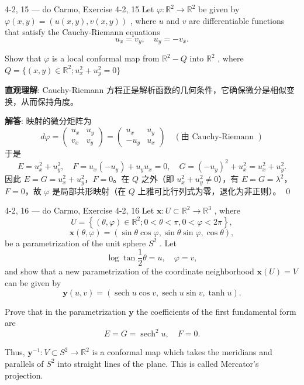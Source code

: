 \begin{exercise}{4-2, 15 — do Carmo, Exercise 4-2, 15}
Let $\varphi \colon \mathbb{R}^2 \to \mathbb{R}^2$ be given by $\varphi(x, y) = (u(x, y), v(x, y))$ , where $u$ and $v$ are differentiable functions that satisfy the Cauchy-Riemann equations
\[
u _ {x} = v _ {y}, \quad u _ {y} = - v _ {x}.
\]

Show that $\varphi$ is a local conformal map from $\mathbb{R}^2 -Q$ into $\mathbb{R}^2$ , where $Q = \{(x,y)\in \mathbb{R}^2;u_x^2 +u_y^2 = 0\}$
\end{exercise}

\begin{solution}
\textbf{直观理解}: Cauchy-Riemann 方程正是解析函数的几何条件，它确保微分是相似变换，从而保持角度。

\textbf{解答}: 映射的微分矩阵为
\[
d\varphi = \begin{pmatrix}u_x & u_y\\ v_x & v_y\end{pmatrix} = \begin{pmatrix}u_x & u_y\\ -u_y & u_x\end{pmatrix}\quad(\text{由 Cauchy-Riemann })
\]
于是
\[
E = u_x^2+u_y^2,\quad F = u_x(-u_y)+u_y u_x = 0,\quad G = (-u_y)^2+u_x^2 = u_x^2+u_y^2.
\]
因此 $E=G = u_x^2+u_y^2$，$F=0$。在 $Q$ 之外（即 $u_x^2+u_y^2\neq 0$），有 $E=G=\lambda^2$，$F=0$，故 $\varphi$ 是局部共形映射（在 $Q$ 上雅可比行列式为零，退化为非正则）。
\qed
\end{solution}

\begin{exercise}{4-2, 16 — do Carmo, Exercise 4-2, 16}
Let $\mathbf{x}\colon U\subset \mathbb{R}^2\to \mathbb{R}^3$ , where
\[
U = \left\{\left(\theta , \varphi\right) \in \mathbb{R} ^ {2}; 0 < \theta < \pi , 0 < \varphi < 2 \pi \right\},
\]
\[
\mathbf {x} (\theta , \varphi) = (\sin \theta \cos \varphi , \sin \theta \sin \varphi , \cos \theta),
\]
be a parametrization of the unit sphere $S^2$ . Let
\[
\log \tan \frac {1}{2} \theta = u, \quad \varphi = v,
\]
and show that a new parametrization of the coordinate neighborhood $\mathbf{x}(U) = V$ can be given by
\[
\mathbf {y} (u, v) = (\operatorname {s e c h} u \cos v, \operatorname {s e c h} u \sin v, \tanh u).
\]

Prove that in the parametrization $\mathbf{y}$ the coefficients of the first fundamental form are
\[
E = G = \operatorname {s e c h} ^ {2} u, \quad F = 0.
\]

Thus, $\mathbf{y}^{-1}\colon V\subset S^2\to \mathbb{R}^2$ is a conformal map which takes the meridians and parallels of $S^2$ into straight lines of the plane. This is called Mercator's projection.
\end{exercise}

